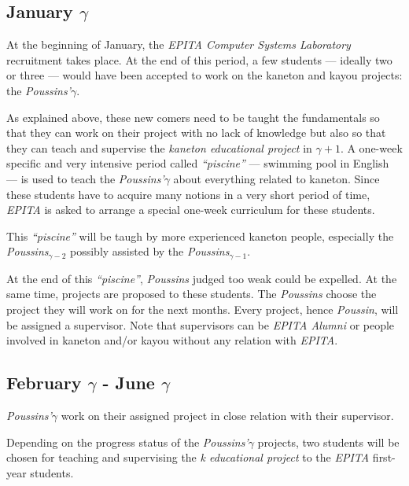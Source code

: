 \begin{multicols}{2}
%
%

\subsection{January $\gamma$}

At the beginning of January, the \textit{EPITA Computer Systems Laboratory}
recruitment takes place. At the end of this period, a few students ---
ideally two or three --- would have been accepted to work on the kaneton and
kayou projects: the \textit{Poussins'$\gamma$}.

As explained above, these new comers need to be taught the fundamentals so
that they can work on their project with no lack of knowledge but also so
that they can teach and supervise the \textit{kaneton educational project}
in $\gamma + 1$. A one-week specific and very intensive period called
\textit{``piscine''} --- swimming pool in English --- is used to teach
the \textit{Poussins'$\gamma$} about everything related to kaneton.
Since these students have to acquire many notions in a very short period of
time, \textit{EPITA} is asked to arrange a special one-week curriculum for
these students.

This \textit{``piscine''} will be taugh by more experienced kaneton people,
especially the \textit{Poussins$_{\gamma - 2}$} possibly assisted by the
\textit{Poussins$_{\gamma - 1}$}.

At the end of this \textit{``piscine''}, \textit{Poussins} judged too weak
could be expelled. At the same time, projects are proposed to these students.
The \textit{Poussins} choose the project they will work on for the next
months. Every project, hence \textit{Poussin}, will be assigned a supervisor.
Note that supervisors can be \textit{EPITA Alumni} or people involved in
kaneton and/or kayou without any relation with \textit{EPITA}.

%
%

\subsection{February $\gamma$ - June $\gamma$}

\textit{Poussins'$\gamma$} work on their assigned project in close relation
with their supervisor.

Depending on the progress status of the \textit{Poussins'$\gamma$} projects,
two students will be chosen for teaching and supervising the
\textit{k educational project} to the \textit{EPITA} first-year students.


\end{multicols}
